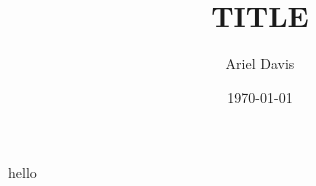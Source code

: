 \documentclass[12pt]{article}
\author{Ariel Davis}
\date{\today}
\title{TITLE}
\begin{document}
\maketitle

hello
\end{document}
